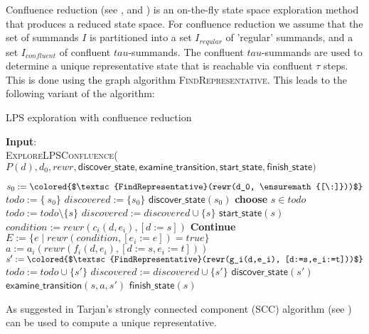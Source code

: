 \documentclass{article}
\newcommand{\emptylist}{\ensuremath{[\:]}}
\begin{document}
Confluence reduction (see \cite{DBLP:conf/mfcs/GrooteP00}, \cite{Blom01partialt-confluence} and \cite{DBLP:conf/cav/BlomP02}) is an on-the-fly state space exploration method that produces a reduced state space. For confluence reduction we assume that the set of summands $I$ is partitioned into a set $I_{reqular}$ of 'regular' summands, and a set $I_{confluent}$ of confluent $tau$-summands. The confluent $tau$-summands are used to determine a unique representative state that is reachable via confluent $\tau$ steps. This is done using the graph algorithm \textsc{FindRepresentative}. This leads to the following variant of the algorithm:

\begin{algorithm}
\small
\caption{LPS exploration with confluence reduction}
\vspace*{1ex}
{\textbf{Input}:} \\
\textsc{ExploreLPSConfluence}($P(d), d_0, rewr, \textsf{discover\_state}, \textsf{examine\_transition}, \textsf{start\_state}, \textsf{finish\_state})$
\begin{algorithmic}[1]
\State $s_0 := \colored{$\textsc{FindRepresentative}(rewr(d_0, \emptylist))$}$
\State $todo := \{\ s_0 \}$
\State $discovered := \{ s_0 \}$
\State $\textsf{discover\_state}(s_0)$
  \State \textbf{choose} $s \in todo$
  \State $todo := todo \setminus \{s\}$
  \State $discovered := discovered \cup \{s\}$
  \State $\textsf{start\_state}(s)$
    \State $condition := rewr(c_i(d, e_i), [d := s])$
      \State \textbf{Continue}
    \EndIf
    \State $E := \{ e \mid rewr(condition, [e_i := e]) = true \}$
      \State $a := a_i(rewr(f_i(d,e_i), [d:=s,e_i:=t]))$
      \State $s' := \colored{$\textsc{FindRepresentative}(rewr(g_i(d,e_i), [d:=s,e_i:=t]))$}$
        \State $todo := todo \cup \{ s' \}$
        \State $discovered := discovered \cup \{s'\}$
        \State $\textsf{discover\_state}(s')$
      \EndIf
      \State $\textsf{examine\_transition}(s, a, s')$
    \EndFor
  \EndFor
  \State $\textsf{finish\_state}(s)$
\EndWhile  
\end{algorithmic}
\end{algorithm}

As suggested in \cite{DBLP:conf/cav/BlomP02} Tarjan's strongly connected component (SCC) algorithm (see \cite{Tarjan72depthfirst}) can be used to compute a unique representative.
\end{document}
